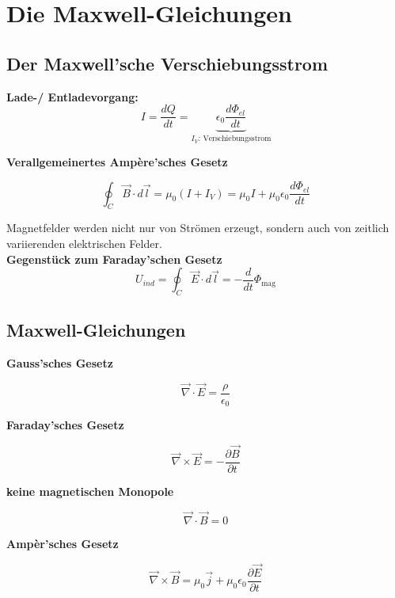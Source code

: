 \section{Die Maxwell-Gleichungen}

\subsection{Der Maxwell'sche Verschiebungsstrom}
\textbf{Lade-/ Entladevorgang:}
\[
    I = \frac{dQ}{dt} = \underbrace{\epsilon_0 \frac{d\Phi_{el}}{dt}}_{I_V \text{: Verschiebungsstrom}}
\]

\textbf{Verallgemeinertes Ampère'sches Gesetz}
\begin{formulabox}
    \[
        \oint_C \Vec{B} \cdot d\Vec{l} = \mu_0 \left( I + I_V \right) = \mu_0 I + \mu_0 \epsilon_0 \frac{d\Phi_{el}}{dt}
    \]
\end{formulabox}

Magnetfelder werden nicht nur von Strömen erzeugt, sondern auch von zeitlich variierenden elektrischen Felder. \\[2ex]

\textbf{Gegenstück zum Faraday'schen Gesetz}
\[
    U_{ind} = \oint_C \vec{E} \cdot d\vec{l} = - \frac{d}{dt} \Phi_{\text{mag}}
\]

\subsection{Maxwell-Gleichungen}
\textbf{Gauss'sches Gesetz}
\begin{formulabox}
    \[
        \vec{\nabla} \cdot \vec{E} = \frac{\rho}{\epsilon_0}
    \]
\end{formulabox}

\textbf{Faraday'sches Gesetz}
\begin{formulabox}
    \[
        \vec{\nabla} \times \vec{E} = - \frac{\partial \vec{B}}{\partial t}
    \]
\end{formulabox}

\vspace{5mm}

\textbf{keine magnetischen Monopole}
\begin{formulabox}
    \[
        \vec{\nabla} \cdot \vec{B} = 0
    \]
\end{formulabox}

\textbf{Ampèr'sches Gesetz}
\begin{formulabox}
    \[
        \vec{\nabla} \times \vec{B} = \mu_0 \vec{j}  + \mu_0 \epsilon_0 \frac{\partial \vec{E}}{\partial t}
    \]
\end{formulabox}

